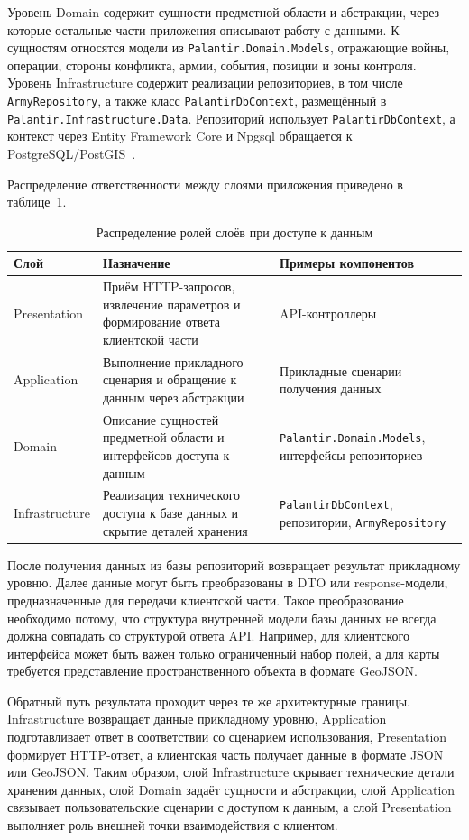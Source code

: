 Уровень Domain содержит сущности предметной области и абстракции, через которые остальные части приложения описывают работу с данными. К сущностям относятся модели из \texttt{Palantir.Domain.Models}, отражающие войны, операции, стороны конфликта, армии, события, позиции и зоны контроля. Уровень Infrastructure содержит реализации репозиториев, в том числе \texttt{ArmyRepository}, а также класс \texttt{PalantirDbContext}, размещённый в \texttt{Palantir.Infrastructure.Data}. Репозиторий использует \texttt{PalantirDbContext}, а контекст через Entity Framework Core и Npgsql обращается к PostgreSQL/PostGIS~\cite{npgsql_efcore_provider}.

Распределение ответственности между слоями приложения приведено в таблице~\ref{tab:data-access-layers}.

\begin{table}[H]
\caption{Распределение ролей слоёв при доступе к данным}
\label{tab:data-access-layers}
\centering
\small
\begin{tabular}{|p{2.5cm}|p{7.7cm}|p{4.8cm}|}
\hline
Слой & Назначение & Примеры компонентов \\
\hline
Presentation & Приём HTTP-запросов, извлечение параметров и формирование ответа клиентской части & API-контроллеры \\
\hline
Application & Выполнение прикладного сценария и обращение к данным через абстракции & Прикладные сценарии получения данных \\
\hline
Domain & Описание сущностей предметной области и интерфейсов доступа к данным & \texttt{Palantir.Domain.Models}, интерфейсы репозиториев \\
\hline
Infrastructure & Реализация технического доступа к базе данных и скрытие деталей хранения & \texttt{PalantirDbContext}, репозитории, \texttt{ArmyRepository} \\
\hline
\end{tabular}
\end{table}

После получения данных из базы репозиторий возвращает результат прикладному уровню. Далее данные могут быть преобразованы в DTO или response-модели, предназначенные для передачи клиентской части. Такое преобразование необходимо потому, что структура внутренней модели базы данных не всегда должна совпадать со структурой ответа API. Например, для клиентского интерфейса может быть важен только ограниченный набор полей, а для карты требуется представление пространственного объекта в формате GeoJSON.

Обратный путь результата проходит через те же архитектурные границы. Infrastructure возвращает данные прикладному уровню, Application подготавливает ответ в соответствии со сценарием использования, Presentation формирует HTTP-ответ, а клиентская часть получает данные в формате JSON или GeoJSON. Таким образом, слой Infrastructure скрывает технические детали хранения данных, слой Domain задаёт сущности и абстракции, слой Application связывает пользовательские сценарии с доступом к данным, а слой Presentation выполняет роль внешней точки взаимодействия с клиентом.

